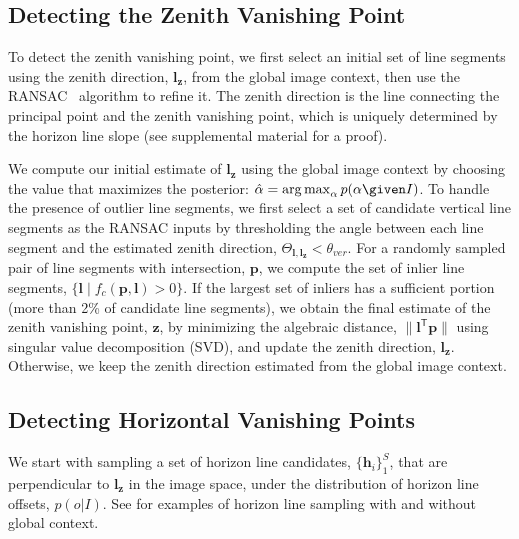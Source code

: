 \subsection{Detecting the Zenith Vanishing Point}
\label{sec:zenithdetection}


To detect the zenith vanishing point, we first select an initial set
of line segments using the zenith direction,
$\mathbf{l}_\mathbf{z}$, from the global image context, then use
the RANSAC~\cite{ransac1981} algorithm to refine it.  The zenith direction
is the line connecting the principal point and the zenith vanishing
point, which is uniquely determined by the horizon line slope (see
supplemental material for a proof).

We compute our initial estimate of $\mathbf{l}_{\mathbf{z}}$ using the global
image context by choosing the value that maximizes the posterior:
$\hat{\alpha} = \operatorname*{arg\,max}_\alpha p(\alpha \given I)$.
%
To handle the presence of outlier line segments, we first select a set
of candidate vertical line segments as the RANSAC inputs by
thresholding the angle between each line segment and the estimated
zenith direction, $\Theta_{\mathbf{l},\mathbf{l}_{\mathbf{z}}} < \theta_{ver}$.  For a
randomly sampled pair of line segments with intersection, $\mathbf{p}$, we
compute the set of inlier line segments, $\{\mathbf{l} \mid f_c(\mathbf{p}, \mathbf{l})
> 0\}$.  If the largest set of inliers has a sufficient portion (more
than 2\% of candidate line segments), we obtain the final estimate of
the zenith vanishing point, $\mathbf{z}$, by minimizing the algebraic
distance, $\|\mathbf{l}^\mathsf{T} \mathbf{p}\|$ using singular value decomposition
(SVD), and update the zenith direction, $\mathbf{l}_{\mathbf{z}}$. Otherwise, we
keep the zenith direction estimated from the global image context.


\subsection{Detecting Horizontal Vanishing Points}
\label{sec:horizondetection}

We start with sampling a set of horizon line candidates,
$\{\mathbf{h}_i\}_1^S$, that are perpendicular to $\mathbf{l}_{\mathbf{z}}$ in the image
space, under the distribution of horizon line offsets, $p(o | I)$.
See  for examples of horizon line sampling with
and without global context.

